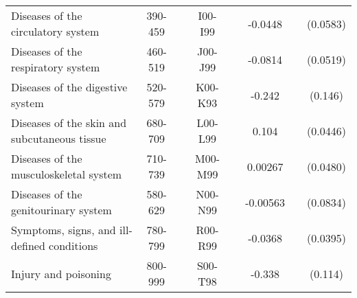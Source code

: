 \documentclass[11pt, a4paper]{article} %
\begin{document}
\begin{table}[htbp]
\begin{threeparttable}
{\begin{tabular}{l*{7}{c}}
 \hspace{4pt} Diseases of the circulatory system                          	&	390-459		& &		I00-I99 & & -0.0448				& & (0.0583)	\\
 \hspace{4pt} Diseases of the respiratory system                          	&	460-519		& &		J00-J99 & & -0.0814				& & (0.0519)	\\
 \hspace{4pt} Diseases of the digestive system                            	&	520-579		& &		K00-K93 & & -0.242				& & (0.146)		\\
 \hspace{4pt} Diseases of the skin and subcutaneous tissue                	&	680-709		& &		L00-L99 & & 0.104\sym{**} 		& & (0.0446)	\\
 \hspace{4pt} Diseases of the musculoskeletal system						&	710-739		& &		M00-M99 & & 0.00267 			& & (0.0480)	\\
 \hspace{4pt} Diseases of the genitourinary system                        	&	580-629		& &		N00-N99 & & -0.00563 			& & (0.0834)	\\
 \hspace{4pt} Symptoms, signs, and ill-defined conditions                 	&	780-799		& &		R00-R99 & & -0.0368 			& & (0.0395)	\\
 \hspace{4pt} Injury and poisoning                                        	&	800-999		& &		S00-T98 & & -0.338\sym{***} 	& & (0.114)		\\

\bottomrule
\end{tabular}}
\end{threeparttable} \end{table}
\end{document}
